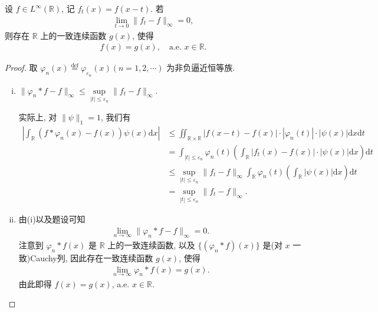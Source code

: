 \documentclass[../../main.tex]{subfiles}%
\begin{document}
\begin{example}
设 $f\in L^\infty(\mathbb{R})$, 记 $f_t(x)=f(x-t)$. 若
\begin{align*}
\lim\limits_{t\to 0} \|f_t - f\|_\infty = 0,
\end{align*}
则存在 $\mathbb{R}$ 上的一致连续函数 $g(x)$, 使得
\begin{align*}
f(x)=g(x), \quad \text{a.e. } x\in \mathbb{R}.
\end{align*}
\end{example}
\begin{proof}

取 $\varphi_n(x) \stackrel{\text{def}}{=} \varphi_{\varepsilon_n}(x)(n=1,2,\cdots)$ 为非负逼近恒等族.
\begin{enumerate}[(i)]
\item $\|\varphi_n * f - f\|_\infty \leqslant \sup\limits_{|t|\leqslant \varepsilon_n} \|f_t - f\|_\infty$.

实际上, 对 $\|\psi\|_1=1$, 我们有
\begin{align*}
\left| \int_{\mathbb{R}} (f*\varphi_n(x)-f(x))\psi(x) \mathrm{d}x \right|
&\leqslant \iint_{\mathbb{R}\times\mathbb{R}} |f(x-t)-f(x)| \cdot |\varphi_n(t)| \cdot |\psi(x)| \mathrm{d}x\mathrm{d}t \\
&= \int_{|t|\leqslant \varepsilon_n} \varphi_n(t) \left( \int_{\mathbb{R}} |f_t(x)-f(x)| \cdot |\psi(x)| \mathrm{d}x \right) \mathrm{d}t \\
&\leqslant \sup\limits_{|t|\leqslant \varepsilon_n} \|f_t - f\|_\infty \int_{\mathbb{R}} \varphi_n(t) \left( \int_{\mathbb{R}} |\psi(x)| \mathrm{d}x \right) \mathrm{d}t \\
&= \sup\limits_{|t|\leqslant \varepsilon_n} \|f_t - f\|_\infty.
\end{align*}

\item 由(i)以及题设可知
\begin{align*}
\lim\limits_{n\to\infty} \|\varphi_n * f - f\|_\infty = 0.
\end{align*}
注意到 $\varphi_n * f(x)$ 是 $\mathbb{R}$ 上的一致连续函数, 以及 $\{(\varphi_n * f)(x)\}$ 是(对 $x$ 一致)Cauchy列, 因此存在一致连续函数 $g(x)$, 使得
\begin{align*}
\lim\limits_{n\to\infty} \varphi_n * f(x) = g(x).
\end{align*}
由此即得 $f(x)=g(x)$, a.e. $x\in \mathbb{R}$.
\end{enumerate}

\end{proof}
\end{document}
